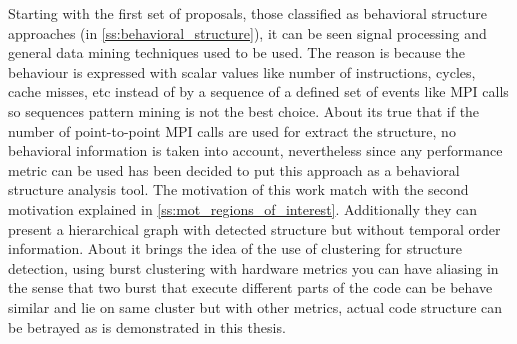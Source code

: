 Starting with the first set of proposals, those classified as behavioral
structure approaches (in \ref{ss:behavioral_structure}), it can be seen signal
processing and general data mining techniques used to be used. The reason is
because the behaviour is expressed with scalar values like number of
instructions, cycles, cache misses, etc instead of by a sequence of a 
defined set of events like MPI calls so sequences pattern mining is not the best
choice. About \cite{casas2007automatic} its true that if the number of 
point-to-point MPI calls are used for extract the structure, no behavioral 
information is taken into account, nevertheless since any performance metric 
can be used has been decided to put this approach as a behavioral structure 
analysis tool. The motivation of this work match with the second motivation
explained in \ref{ss:mot_regions_of_interest}. Additionally they can present a
hierarchical graph with detected structure but without temporal order
information. About \cite{gonzalez2013application} it brings the idea of the use
of clustering for structure detection, using burst clustering with hardware 
metrics you can have aliasing in the sense that two burst that execute different
parts of the code can be behave similar and lie on same cluster but with other
metrics, actual code structure can be betrayed as is demonstrated in this
thesis.

